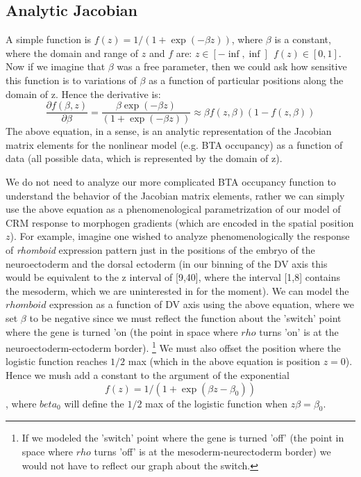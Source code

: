 \subsection{ Analytic Jacobian }
A simple function is $f(z)=1/(1+\exp(-\beta z))$, where $\beta$ is a constant, where the domain and range of $z$ and $f$ are: $z \in [-\inf,\inf] \ \ f(z) \in [0,1]$.  Now if we imagine that $\beta$ was a free parameter, then we could ask how sensitive this function is to variations of $\beta$ as a function of particular positions along the domain of z.  Hence the derivative is:
\begin{equation}
 \frac{\partial{f(\beta,z)}}{\partial{\beta}}= \frac{\beta \exp{(-\beta z)}}{(1 + \exp{(-\beta z)})} \approx  \beta f(z,\beta) (1-f(z,\beta))
 \end{equation}
 The above equation, in a sense, is an analytic representation of the Jacobian matrix elements for the nonlinear model (e.g. BTA occupancy) as a function of data (all possible data, which is represented by the domain of z).  
 
 We do not need to analyze our more complicated BTA occupancy function to understand the behavior of the Jacobian matrix elements, rather we can simply use the above equation as a phenomenological parametrization of our model of CRM response to morphogen gradients (which are encoded in the spatial position $z$).  For example, imagine one wished to analyze phenomenologically the response of \textit{rhomboid} expression pattern just in the positions of the embryo of the neuroectoderm and the dorsal ectoderm (in our binning of the DV axis this would be equivalent to the z interval of [9,40], where the interval [1,8] contains the mesoderm, which we are uninterested in for the moment).  We can model the $rhomboid$ expression as a function of DV axis using the above equation, where we set $\beta$ to be negative since we must reflect the function about the 'switch' point where the gene is turned 'on (the point in space where $rho$ turns 'on' is at the neuroectoderm-ectoderm border).  \footnote{If we modeled the 'switch' point where the gene is turned 'off' (the point in space where $rho$ turns 'off' is at the mesoderm-neurectoderm border) we would not have to reflect our graph about the switch.}  We must also offset the position where the logistic function reaches $1/2$ max (which in the above equation is position $z=0$).  Hence we mush add a constant to the argument of the exponential $$f(z)=1/(1+\exp(\beta z -\beta_0 ))$$, where $beta_0 $ will define the $1/2$ max of the logistic function when $z\beta=\beta_0$.
 
